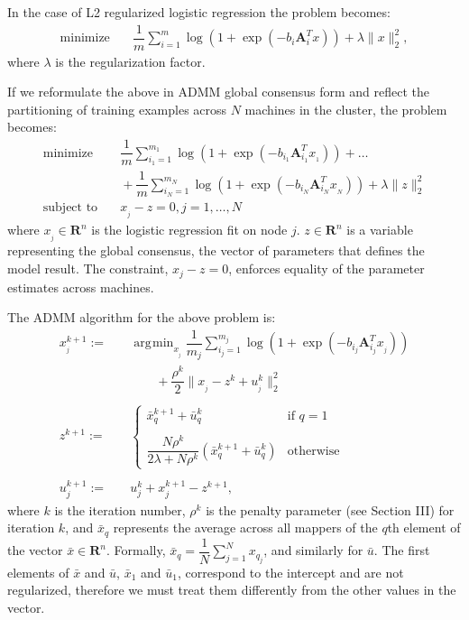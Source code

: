 \documentclass[10pt, conference, compsocconf]{IEEEtran}
\DeclareMathOperator*{\argmin}{arg\!\min}
\begin{document}
In the case of L2 regularized logistic regression the problem becomes:
\begin{align*}
\text{minimize}&\quad \dfrac{1}{m}\sum_{i=1}^m \log(1 + \exp(-b_i\mathbf{A}_i^Tx)) + \lambda\|x\|_2^2,
\end{align*}
where $\lambda$ is the regularization factor.

If we reformulate the above in ADMM global consensus form and reflect the partitioning of training examples across $N$ machines in the cluster, the problem becomes:
\begin{align*}
\text{minimize}&\quad \dfrac{1}{m}\sum_{i_1=1}^{m_1} \log(1 + \exp(-b_{i_1}\mathbf{A}_{i_1}^Tx_{_1}))+\ldots \\
&\quad+\dfrac{1}{m}\sum_{i_N=1}^{m_N} \log(1 + \exp(-b_{i_N}\mathbf{A}_{i_N}^Tx_{_N}))+\lambda\|z\|_2^2\\
\text{subject to}&\quad x_{_j} - z = 0, j = 1, \ldots, N
\end{align*}
where $x_{_j}\in\mathbf{R}^n$ is the logistic regression fit on node $j$.  $z\in\mathbf{R}^n$ is a variable representing the global consensus, the vector of parameters that defines the model result. The constraint, $x_j-z=0$, enforces equality of the parameter estimates across machines.

The ADMM algorithm for the above problem is:
\begin{align}
\label{eq:x}
x_{_j}^{k+1} :=&\quad \argmin_{x_{_j}} \dfrac{1}{m_j}\sum_{i_j=1}^{m_j} \log(1 + \exp(-b_{i_j}\mathbf{A}_{i_j}^Tx_{_j})) \\
&\quad\quad\quad+ \dfrac{\rho^k}{2}\|x_{_j} - z^k + u_{_j}^k\|_2^2 \nonumber\\
\nonumber\\
\label{eq:z}
z^{k+1} :=&\quad \begin{cases}
    \bar{x}_q^{k+1} + \bar{u}_q^k& \text{if $q=1$}\\
    \\
    \dfrac{N\rho^k}{2\lambda + N\rho^k}(\bar{x}_q^{k+1} + \bar{u}_q^k)& \text{otherwise}
  \end{cases}\\
\nonumber\\
\label{eq:u}
u_j^{k+1} :=&\quad u_j^k + x_j^{k+1} - z^{k+1},
\end{align}
where $k$ is the iteration number, $\rho^k$ is the penalty parameter (see Section III) for iteration $k$, and $\bar{x}_q$ represents the average across all mappers of the $q$th element of the vector $\bar{x}\in\mathbf{R}^n$.  Formally, $\bar{x}_q = \dfrac{1}{N}\sum_{j=1}^N x_{q_j}$, and similarly for $\bar{u}$.  The first elements of $\bar{x}$ and $\bar{u}$, $\bar{x}_1$ and $\bar{u}_1$, correspond to the intercept and are not regularized, therefore we must treat them differently from the other values in the vector.
\end{document}
